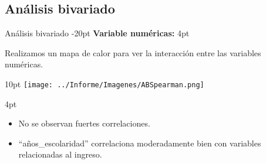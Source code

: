 \documentclass[pdf]{beamer}
\def\vspace{}%
\begin{document}
{    \subsection{Análisis bivariado}

\begin{frame}{Análisis bivariado}
    \vspace{-20pt}
    \textbf{Variable numéricas:}
    \vspace{4pt}

    Realizamos un mapa de calor para ver la interacción entre las variables numéricas.

    \begin{minipage}{0.5\textwidth}
        \vspace{10pt}
        \texttt{[image: ../Informe/Imagenes/ABSpearman.png]}
    \end{minipage}
    \begin{minipage}{0.48\textwidth}
        \vspace{4pt}
        \begin{itemize}
            \justifying%
            \item No se observan fuertes correlaciones.
            \item ``años\_escolaridad'' correlaciona moderadamente bien con variables relacionadas al ingreso.
        \end{itemize}
    \end{minipage}

\end{frame}
 
 
 
}
\end{document}
